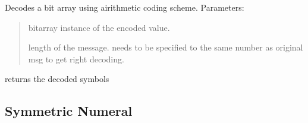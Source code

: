 \documentclass[letterpaper,10pt,english]{sphinxmanual}
\begin{document}
\begin{fulllineitems}
\begin{fulllineitems}
\label{\detokenize{arithmetic_coding:arithmetic_coding.RangeDecoder.decode}}
\pysigstartsignatures
{}
\pysigstopsignatures
\sphinxAtStartPar
Decodes a bit array using airithmetic coding scheme. 
Parameters:
\begin{quote}
\begin{description}
\sphinxAtStartPar
bitarray instance of the encoded value.

\sphinxAtStartPar
length of the message. needs to be specified to the same number as original msg to get right decoding.

\end{description}
\end{quote}
\begin{description}
\begin{description}
\sphinxAtStartPar
returns the decoded symbols

\end{description}

\end{description}

\end{fulllineitems}


\end{fulllineitems}


\sphinxstepscope


\subsection{Symmetric Numeral}
\label{\detokenize{symmetric_numeral:module-symmetric_numeral}}\label{\detokenize{symmetric_numeral:symmetric-numeral}}\label{\detokenize{symmetric_numeral::doc}}
\end{document}
